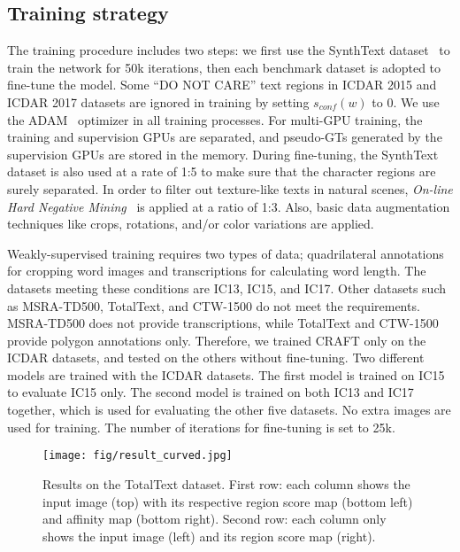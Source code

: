 \documentclass[10pt,twocolumn,letterpaper]{article}
\begin{document}
\subsection{Training strategy}
The training procedure includes two steps: we first use the SynthText dataset~\cite{gupta2016synthetic} to train the network for 50k iterations, then each benchmark dataset is adopted to fine-tune the model. Some “DO NOT CARE” text regions in ICDAR 2015 and ICDAR 2017 datasets are ignored in training by setting $s_{conf}(w)$ to 0. We use the ADAM~\cite{kingma2015adam} optimizer in all training processes. For multi-GPU training, the training and supervision GPUs are separated, and pseudo-GTs generated by the supervision GPUs are stored in the memory. During fine-tuning, the SynthText dataset is also used at a rate of 1:5 to make sure that the character regions are surely separated.
In order to filter out texture-like texts in natural scenes, \textit{On-line Hard Negative Mining}~\cite{shrivastava2016training} is applied at a ratio of 1:3. Also, basic data augmentation techniques like crops, rotations, and/or color variations are applied. 




Weakly-supervised training requires two types of data; quadrilateral annotations for cropping word images and transcriptions for calculating word length. The datasets meeting these conditions are IC13, IC15, and IC17. Other datasets such as MSRA-TD500, TotalText, and CTW-1500 do not meet the requirements.
MSRA-TD500 does not provide transcriptions, while TotalText and CTW-1500 provide polygon annotations only. 
Therefore, we trained CRAFT only on the ICDAR datasets, and tested on the others without fine-tuning. Two different models are trained with the ICDAR datasets. The first model is trained on IC15 to evaluate IC15 only. The second model is trained on both IC13 and IC17 together, which is used for evaluating the other five datasets. No extra images are used for training. The number of iterations for fine-tuning is set to 25k.



\begin{figure*}[t]
  \centering
  \texttt{[image: fig/result\_curved.jpg]}
  \caption{Results on the TotalText dataset. First row: each column shows the input image (top) with its respective region score map (bottom left) and affinity map (bottom right). Second row: each column only shows the input image (left) and its region score map (right).}
\label{fig:result_curved} 
\end{figure*}
\end{document}
